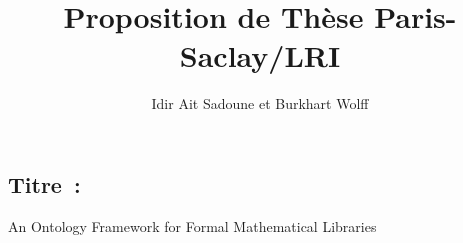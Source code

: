\documentclass[a4paper,10pt]{article}
\begin{document}
\title{\textbf{Proposition de Thèse Paris-Saclay/LRI}}
\author{Idir Ait Sadoune et Burkhart Wolff}
\date{}

\maketitle

\subsection*{Titre~:}
\begin{center}
\large An Ontology Framework for Formal Mathematical Libraries
\end{center}


\end{document}
